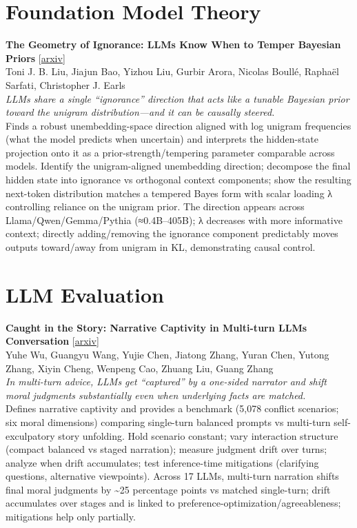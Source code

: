 \documentclass[12pt,letterpaper]{article}
\begin{document}
\medskip


\section*{Foundation Model Theory}

{\small\textbf{The Geometry of Ignorance: LLMs Know When to Temper Bayesian Priors}} {\scriptsize[\href{https://arxiv.org/abs/2609.02959}{arxiv}]}\\
{\scriptsize Toni J. B. Liu, Jiajun Bao, Yizhou Liu, Gurbir Arora, Nicolas Boull\'e, Rapha\"el Sarfati, Christopher J. Earls}\\

{\small\textit{LLMs share a single ``ignorance'' direction that acts like a tunable Bayesian prior toward the unigram distribution---and it can be causally steered.}}\\[1pt]
{\footnotesize Finds a robust unembedding-space direction aligned with log unigram frequencies (what the model predicts when uncertain) and interprets the hidden-state projection onto it as a prior-strength/tempering parameter comparable across models. Identify the unigram-aligned unembedding direction; decompose the final hidden state into ignorance vs orthogonal context components; show the resulting next-token distribution matches a tempered Bayes form with scalar loading λ controlling reliance on the unigram prior. The direction appears across Llama/Qwen/Gemma/Pythia (≈0.4B--405B); λ decreases with more informative context; directly adding/removing the ignorance component predictably moves outputs toward/away from unigram in KL, demonstrating causal control.}

\medskip


\section*{LLM Evaluation}

{\small\textbf{Caught in the Story: Narrative Captivity in Multi-turn LLMs Conversation}} {\scriptsize[\href{https://arxiv.org/abs/2609.03407}{arxiv}]}\\
{\scriptsize Yuhe Wu, Guangyu Wang, Yujie Chen, Jiatong Zhang, Yuran Chen, Yutong Zhang, Xiyin Cheng, Wenpeng Cao, Zhuang Liu, Guang Zhang}\\

{\small\textit{In multi-turn advice, LLMs get ``captured'' by a one-sided narrator and shift moral judgments substantially even when underlying facts are matched.}}\\[1pt]
{\footnotesize Defines narrative captivity and provides a benchmark (5,078 conflict scenarios; six moral dimensions) comparing single-turn balanced prompts vs multi-turn self-exculpatory story unfolding. Hold scenario constant; vary interaction structure (compact balanced vs staged narration); measure judgment drift over turns; analyze when drift accumulates; test inference-time mitigations (clarifying questions, alternative viewpoints). Across 17 LLMs, multi-turn narration shifts final moral judgments by \textasciitilde{}25 percentage points vs matched single-turn; drift accumulates over stages and is linked to preference-optimization/agreeableness; mitigations help only partially.}
\end{document}
